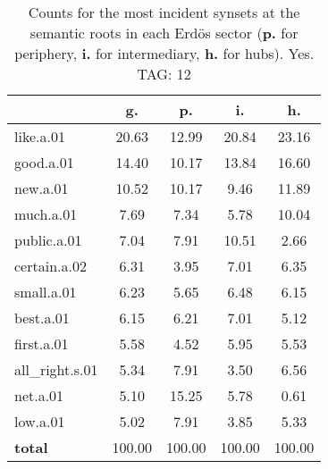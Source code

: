 \begin{table}[h!]
\begin{center}
\begin{tabular}{| l | c | c | c | c |}\hline
 & g. & p. & i. & h. \\\hline
like.a.01 & 20.63  & 12.99  & 20.84  & 23.16 \\\hline
good.a.01 & 14.40  & 10.17  & 13.84  & 16.60 \\\hline
new.a.01 & 10.52  & 10.17  & 9.46  & 11.89 \\\hline
much.a.01 & 7.69  & 7.34  & 5.78  & 10.04 \\\hline
public.a.01 & 7.04  & 7.91  & 10.51  & 2.66 \\\hline
certain.a.02 & 6.31  & 3.95  & 7.01  & 6.35 \\\hline
small.a.01 & 6.23  & 5.65  & 6.48  & 6.15 \\\hline
best.a.01 & 6.15  & 6.21  & 7.01  & 5.12 \\\hline
first.a.01 & 5.58  & 4.52  & 5.95  & 5.53 \\\hline
all\_right.s.01 & 5.34  & 7.91  & 3.50  & 6.56 \\\hline
net.a.01 & 5.10  & 15.25  & 5.78  & 0.61 \\\hline
low.a.01 & 5.02  & 7.91  & 3.85  & 5.33 \\\hline
{{\bf total}} & 100.00  & 100.00  & 100.00  & 100.00 \\\hline
\end{tabular}
\caption{Counts for the most incident synsets at the semantic roots in each Erd\"os sector ({\bf p.} for periphery, {\bf i.} for intermediary, {\bf h.} for hubs). Yes. TAG: 12}
\end{center}
\end{table}